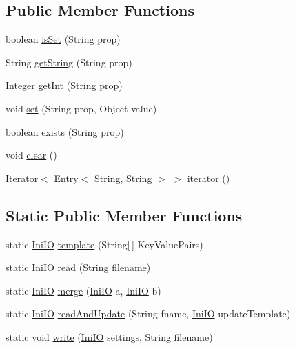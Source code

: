 \subsection*{Public Member Functions}
\begin{DoxyCompactItemize}
\item 
boolean \hyperlink{classqlib_1_1ide_1_1IniIO_a69a0c6a7e4bf6d161e37db728bff03a6}{is\+Set} (String prop)
\item 
String \hyperlink{classqlib_1_1ide_1_1IniIO_aab6608976c5f371d0f044fc7d39f0328}{get\+String} (String prop)
\item 
Integer \hyperlink{classqlib_1_1ide_1_1IniIO_a01a6fe06552fefab11669ea65ace7392}{get\+Int} (String prop)
\item 
void \hyperlink{classqlib_1_1ide_1_1IniIO_a2337d52ad4d343c74b808f64e70710f0}{set} (String prop, Object value)
\item 
boolean \hyperlink{classqlib_1_1ide_1_1IniIO_a68567b380e0074a223137077125eb060}{exists} (String prop)
\item 
void \hyperlink{classqlib_1_1ide_1_1IniIO_a586ba8be1bf5be1d406c75da8a99464f}{clear} ()
\item 
Iterator$<$ Entry$<$ String, String $>$ $>$ \hyperlink{classqlib_1_1ide_1_1IniIO_a51efa19f17cc902c47b577d39177172f}{iterator} ()
\end{DoxyCompactItemize}
\subsection*{Static Public Member Functions}
\begin{DoxyCompactItemize}
\item 
static \hyperlink{classqlib_1_1ide_1_1IniIO}{Ini\+IO} \hyperlink{classqlib_1_1ide_1_1IniIO_a02df232b5337879896c1e067b6e27601}{template} (String\mbox{[}$\,$\mbox{]} Key\+Value\+Pairs)
\item 
static \hyperlink{classqlib_1_1ide_1_1IniIO}{Ini\+IO} \hyperlink{classqlib_1_1ide_1_1IniIO_ae79dc4c2b69222d0e1725e70406da4c6}{read} (String filename)
\item 
static \hyperlink{classqlib_1_1ide_1_1IniIO}{Ini\+IO} \hyperlink{classqlib_1_1ide_1_1IniIO_aa8afcd3e7f28ea7d5324ab186650be1d}{merge} (\hyperlink{classqlib_1_1ide_1_1IniIO}{Ini\+IO} a, \hyperlink{classqlib_1_1ide_1_1IniIO}{Ini\+IO} b)
\item 
static \hyperlink{classqlib_1_1ide_1_1IniIO}{Ini\+IO} \hyperlink{classqlib_1_1ide_1_1IniIO_a25c322821c43bb710404a05210fb20be}{read\+And\+Update} (String fname, \hyperlink{classqlib_1_1ide_1_1IniIO}{Ini\+IO} update\+Template)
\item 
static void \hyperlink{classqlib_1_1ide_1_1IniIO_a10bafd582cb3816d23c93f1883b3e68b}{write} (\hyperlink{classqlib_1_1ide_1_1IniIO}{Ini\+IO} settings, String filename)
\end{DoxyCompactItemize}
